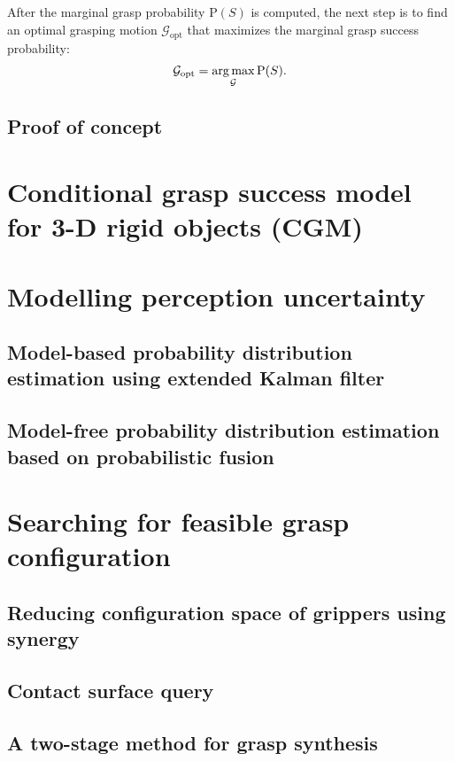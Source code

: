After the marginal grasp probability $\text{P}(S)$ is computed, the next step is to find an optimal grasping motion $\mathcal{G}_\text{opt}$ that maximizes the marginal grasp success probability:
\begin{equation}
\mathcal{G}_\text{opt} = \operatorname*{arg\,max}_\mathcal{G} \text{P}(S).
\label{eq_g_opt}
\end{equation}
 



\subsection{Proof of concept}

\section{Conditional grasp success model for 3-D rigid objects (CGM)}

\section{Modelling perception uncertainty}

\subsection{Model-based probability distribution estimation using extended Kalman filter}


\subsection{Model-free probability distribution estimation based on probabilistic fusion}


\section{Searching for feasible grasp configuration}

\subsection{Reducing configuration space of grippers using synergy }

\subsection{Contact surface query}

\subsection{A two-stage method for grasp synthesis}







